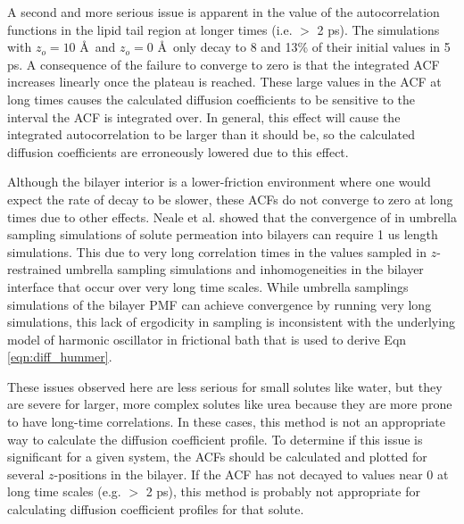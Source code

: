 A second and more serious issue is apparent in the value of the autocorrelation functions in the lipid tail region at longer times (i.e. $>$ 2 ps). The simulations with $z_o=10$ \AA\ and $z_o=0$ \AA\ only decay to 8 and 13\% of their initial values in 5 ps. A consequence of the failure to converge to zero is that the integrated ACF increases linearly once the plateau is reached. These large values in the ACF at long times causes the calculated diffusion coefficients to be sensitive to the interval the ACF is integrated over. In general, this effect will cause the integrated autocorrelation to be larger than it should be, so the calculated diffusion coefficients are erroneously lowered due to this effect.

Although the bilayer interior is a lower-friction environment where one would expect the rate of decay to be slower, these ACFs do not converge to zero at long times due to other effects. Neale et al.\cite{Neale2011,Neale2014} showed that the convergence of in umbrella sampling simulations of solute permeation into bilayers can require 1 us length simulations. This due to very long correlation times in the values sampled in $z$-restrained umbrella sampling simulations and inhomogeneities in the bilayer interface that occur over very long time scales. While umbrella samplings simulations of the bilayer PMF can achieve convergence by running very long simulations, this lack of ergodicity in sampling is inconsistent with the underlying model of harmonic oscillator in frictional bath that is used to derive Eqn \ref{eqn:diff_hummer}.

These issues observed here are less serious for small solutes like water,\cite{Riahi2014,PeslherbeCholesterol} but they are severe for larger, more complex solutes like urea because they are more prone to have long-time correlations. In these cases, this method is not an appropriate way to calculate the diffusion coefficient profile. To determine if this issue is significant for a given system, the ACFs should be calculated and plotted for several $z$-positions in the bilayer. If the ACF has not decayed to values near 0 at long time scales (e.g. $>$ 2 ps), this method is probably not appropriate for calculating diffusion coefficient profiles for that solute.
